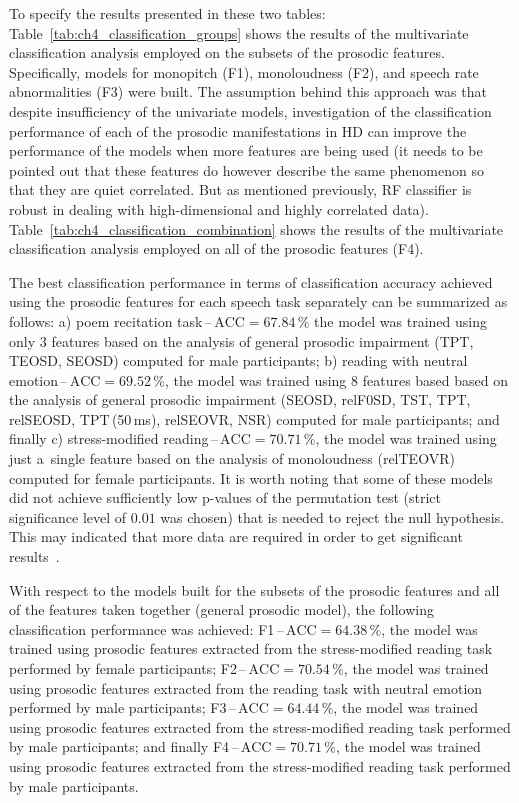 \newpage
To specify the results presented in these two tables: Table~\ref{tab:ch4_classification_groups} shows the results of the multivariate classification analysis employed on the subsets of the prosodic features. Specifically, models for monopitch (F1), monoloudness (F2), and speech rate abnormalities (F3) were built. The assumption behind this approach was that despite insufficiency of the univariate models, investigation of the classification performance of each of the prosodic manifestations in HD can improve the performance of the models when more features are being used (it needs to be pointed out that these features do however describe the same phenomenon so that they are quiet correlated. But as mentioned previously, RF classifier is robust in dealing with high-dimensional and highly correlated data). Table~\ref{tab:ch4_classification_combination} shows the results of the multivariate classification analysis employed on all of the prosodic features (F4).

The best classification performance in terms of classification accuracy achieved using the prosodic features for each speech task separately can be summarized as follows: a) poem recitation task\,--\,$\mbox{ACC}=67.84\,\%$ the model was trained using only $3$ features based on the analysis of general prosodic impairment (TPT, TEOSD, SEOSD) computed for male participants; b) reading with neutral emotion\,--\,$\mbox{ACC}=69.52\,\%$, the model was trained using $8$ features based based on the analysis of general prosodic impairment (SEOSD, relF0SD, TST, TPT, relSEOSD, TPT\,(50\,ms), relSEOVR, NSR) computed for male participants; and finally c) stress-modified reading\,--\,$\mbox{ACC}=70.71\,\%$, the model was trained using just a~single feature based on the analysis of monoloudness (relTEOVR) computed for female participants. It is worth noting that some of these models did not achieve sufficiently low p-values of the permutation test (strict significance level of $0.01$ was chosen) that is needed to reject the null hypothesis. This may indicated that more data are required in order to get significant results~\cite{Golland2005}.

With respect to the models built for the subsets of the prosodic features and all of the features taken together (general prosodic model), the following classification performance was achieved: F1\,--\,$\mbox{ACC}=64.38\,\%$, the model was trained using prosodic features extracted from the stress-modified reading task performed by female participants; F2\,--\,$\mbox{ACC}=70.54\,\%$, the model was trained using prosodic features extracted from the reading task with neutral emotion performed by male participants; F3\,--\,$\mbox{ACC}=64.44\,\%$, the model was trained using prosodic features extracted from the stress-modified reading task performed by male participants; and finally F4\,--\,$\mbox{ACC}=70.71\,\%$, the model was trained using prosodic features extracted from the stress-modified reading task performed by male participants.

